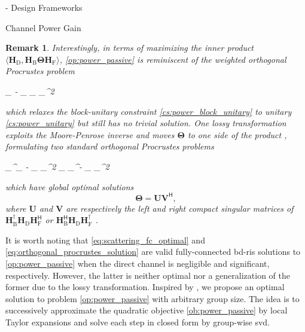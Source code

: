 \documentclass[journal]{IEEEtran}
\newtheorem{remark}{Remark}
\begin{document}
\begin{section}{- Design Frameworks}
\begin{subsection}{Channel Power Gain}
		\begin{remark}
			Interestingly, in terms of maximizing the inner product $\langle \mathbf{H}_\mathrm{D}, \mathbf{H}_\mathrm{B} \mathbf{\Theta} \mathbf{H}_\mathrm{F} \rangle$, \eqref{op:power_passive} is reminiscent of the weighted orthogonal Procrustes problem \cite{Gower2004}
			\begin{mini!}
				{\scriptstyle{\mathbf{\Theta}}}{\lVert {}_ - _ \mathbf{\Theta} _\mathrm{F} \rVert _^2}{\label{op:weighted_orthogonal_procrustes}}{}
			\end{mini!}
			which relaxes the block-unitary constraint \eqref{cs:power_block_unitary} to unitary \eqref{cs:power_unitary} but still has no trivial solution.
			One lossy transformation exploits the Moore-Penrose inverse and moves $\mathbf{\Theta}$ to one side of the product \cite{Bell2003}, formulating two standard orthogonal Procrustes problems
			\begin{mini!}
				{\scriptstyle{\mathbf{\Theta}}}{\lVert {}_^\dagger {}_ - \mathbf{\Theta} _\mathrm{F} \rVert _^2  \lVert \mathbf{H}_ _^\dagger - _ \mathbf{\Theta} \rVert _^2}{\label{op:standard_orthogonal_procrustes}}{}
				\addConstraint{\mathbf{\Theta}^\mathsf{H} \mathbf{\Theta}=\mathbf{I},}{}{}
			\end{mini!}
			which have global optimal solutions
			\begin{equation}
				\mathbf{\Theta} = \mathbf{U} \mathbf{V}^\mathsf{H},
				\label{eq:orthogonal_procrustes_solution}
			\end{equation}
			where $\mathbf{U}$ and $\mathbf{V}$ are respectively the left and right compact singular matrices of $\mathbf{H}_\mathrm{B}^\dagger \mathbf{H}_\mathrm{D} \mathbf{H}_\mathrm{F}^\mathsf{H}$ or $\mathbf{H}_\mathrm{B}^\mathsf{H} \mathbf{H}_\mathrm{D} \mathbf{H}_\mathrm{F}^\dagger$ \cite{Golub2013}.
		\end{remark}

		It is worth noting that \eqref{eq:scattering_fc_optimal} and \eqref{eq:orthogonal_procrustes_solution} are valid fully-connected \gls{bd}-\gls{ris} solutions to \eqref{op:power_passive} when the direct channel is negligible and significant, respectively.
		However, the latter is neither optimal nor a generalization of the former due to the lossy transformation.
		Inspired by \cite{Nie2017}, we propose an optimal solution to problem \eqref{op:power_passive} with arbitrary group size.
		The idea is to successively approximate the quadratic objective \eqref{ob:power_passive} by local Taylor expansions and solve each step in closed form by group-wise \gls{svd}.


\end{subsection}
\end{section}
\end{document}
